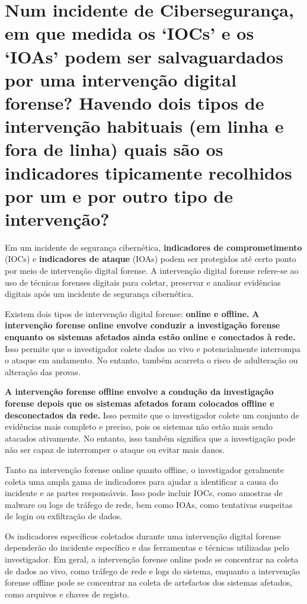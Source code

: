 \section[Pergunta 4]{Num incidente de Cibersegurança, em que medida os `IOCs' e os `IOAs' podem ser salvaguardados por uma intervenção digital forense? Havendo dois tipos de intervenção habituais (em linha e fora de linha) quais são os indicadores tipicamente recolhidos por um e por outro tipo de intervenção?}

Em um incidente de segurança cibernética, \textbf{indicadores de comprometimento} (IOCs) e \textbf{indicadores de ataque} (IOAs) podem ser protegidos até certo ponto por meio de intervenção digital forense. A intervenção digital forense refere-se ao uso de técnicas forenses digitais para coletar, preservar e analisar evidências digitais após um incidente de segurança cibernética.

Existem dois tipos de intervenção digital forense: \textbf{online e offline.} \textbf{A intervenção forense online envolve conduzir a investigação forense enquanto os sistemas afetados ainda estão online e conectados à rede.} Isso permite que o investigador colete dados ao vivo e potencialmente interrompa o ataque em andamento. No entanto, também acarreta o risco de adulteração ou alteração das provas.

\textbf{A intervenção forense offline envolve a condução da investigação forense depois que os sistemas afetados foram colocados offline e desconectados da rede.} Isso permite que o investigador colete um conjunto de evidências mais completo e preciso, pois os sistemas não estão mais sendo atacados ativamente. No entanto, isso também significa que a investigação pode não ser capaz de interromper o ataque ou evitar mais danos.

Tanto na intervenção forense online quanto offline, o investigador geralmente coleta uma ampla gama de indicadores para ajudar a identificar a causa do incidente e as partes responsáveis. Isso pode incluir IOCs, como amostras de malware ou logs de tráfego de rede, bem como IOAs, como tentativas suspeitas de login ou exfiltração de dados.

Os indicadores específicos coletados durante uma intervenção digital forense dependerão do incidente específico e das ferramentas e técnicas utilizadas pelo investigador. Em geral, a intervenção forense online pode se concentrar na coleta de dados ao vivo, como tráfego de rede e logs do sistema, enquanto a intervenção forense offline pode se concentrar na coleta de artefactos dos sistemas afetados, como arquivos e chaves de registo.

